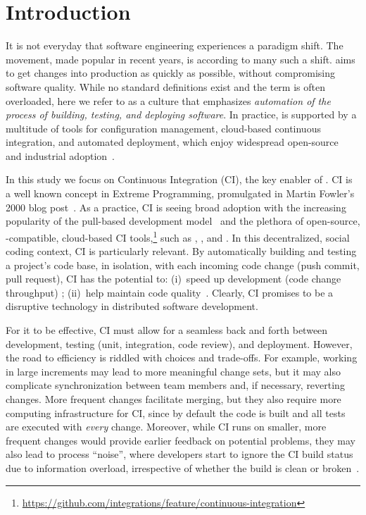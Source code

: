 
\section{Introduction}

It is not everyday that software engineering experiences a paradigm shift.
The \DO movement, made popular in recent years, is according to many
\cite{degrandis2011devops, loukides2012devops, humble2011enterprises, 
roche2013adopting} such a shift.
\DO aims to get changes into production as quickly as 
possible, without compromising software quality.
While no standard definitions exist and the term is often overloaded, here
we refer to \DO as a culture that emphasizes \emph{automation of the 
process of building, testing, and deploying software}.
In practice, \DO is supported by a multitude of tools for configuration management, 
cloud-based continuous integration, and automated deployment,
which enjoy widespread open-source~\cite{Hilton2016} and industrial 
adoption~\cite{rightscale, hilton2016continuous}.

In this study we focus on Continuous Integration (CI), the key enabler of \DO.
CI is a well known concept in Extreme Programming, promulgated in 
Martin Fowler's 2000 blog post~\cite{fowler2000continuous}.
As a practice, CI is seeing broad adoption with the increasing popularity
of the \GH pull-based development model~\cite{gousios2014exploratory}
and the plethora of open-source, \GH-compatible, cloud-based CI 
tools,\footnote{\url{https://github.com/integrations/feature/continuous-integration}}
such as \Tvis, \CB, and \CCI.
In this decentralized, social coding context, CI is particularly relevant. 
By automatically building and testing a project's code base, in isolation, 
with each incoming code change (\ie push commit, pull request), CI 
has the potential to: (i)~speed up development (code change throughput)
\cite{Stolberg, pham2013creating, Hilton2016};
(ii)~help maintain code quality~\cite{VasilescuYWDF15, gousios2015work}.
Clearly, CI promises to be a disruptive technology in distributed software
development.

For it to be effective, CI must allow for a seamless back and forth between
development, testing (\eg unit, integration, code review), and deployment. 
However, the road to efficiency is riddled with choices and trade-offs.
For example, working in large increments may lead to more meaningful
change sets, but it may also complicate synchronization between team 
members and, if necessary, reverting changes.
More frequent changes facilitate merging, but they also require more 
computing infrastructure for CI, since by default the code is built and all 
tests are executed with \emph{every} change.
Moreover, while CI runs on smaller, more frequent changes would provide 
earlier feedback on potential problems, they may also lead to process 
``noise'', where developers start to ignore the CI build status due to 
information overload, irrespective of whether the build is clean or 
broken~\cite{DeadCI}.

